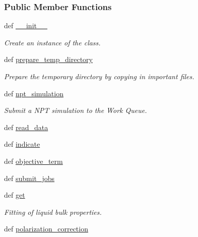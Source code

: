 \subsubsection*{\-Public \-Member \-Functions}
\begin{DoxyCompactItemize}
\item 
def \hyperlink{classforcebalance_1_1tinkerio_1_1Liquid__TINKER_a307529b9902b34a790a8b016e153c7d6}{\-\_\-\-\_\-init\-\_\-\-\_\-}
\begin{DoxyCompactList}\small\item\em \-Create an instance of the class. \end{DoxyCompactList}\item 
def \hyperlink{classforcebalance_1_1tinkerio_1_1Liquid__TINKER_ad07e4415104e2695d6b6557e2755c7dd}{prepare\-\_\-temp\-\_\-directory}
\begin{DoxyCompactList}\small\item\em \-Prepare the temporary directory by copying in important files. \end{DoxyCompactList}\item 
def \hyperlink{classforcebalance_1_1tinkerio_1_1Liquid__TINKER_a53a10ac99cdfbf026526ed625d4de809}{npt\-\_\-simulation}
\begin{DoxyCompactList}\small\item\em \-Submit a \-N\-P\-T simulation to the \-Work \-Queue. \end{DoxyCompactList}\item 
def \hyperlink{classforcebalance_1_1liquid_1_1Liquid_a08b698af913d56f780d0587821c922cd}{read\-\_\-data}
\item 
def \hyperlink{classforcebalance_1_1liquid_1_1Liquid_ae94ce30dfd0e92fdd6d746e6743be844}{indicate}
\item 
def \hyperlink{classforcebalance_1_1liquid_1_1Liquid_a00c23db61bcb86cc19f79dacdb2bc1f3}{objective\-\_\-term}
\item 
def \hyperlink{classforcebalance_1_1liquid_1_1Liquid_a716e28bb5572b3273036ac753b7e1e1d}{submit\-\_\-jobs}
\item 
def \hyperlink{classforcebalance_1_1liquid_1_1Liquid_a802c4139e5c002fabdeab5de88093880}{get}
\begin{DoxyCompactList}\small\item\em \-Fitting of liquid bulk properties. \end{DoxyCompactList}\item 
def \hyperlink{classforcebalance_1_1liquid_1_1Liquid_a51ea9d9fb4418ec2497fe8e2d8033d41}{polarization\-\_\-correction}

\end{DoxyCompactItemize}
